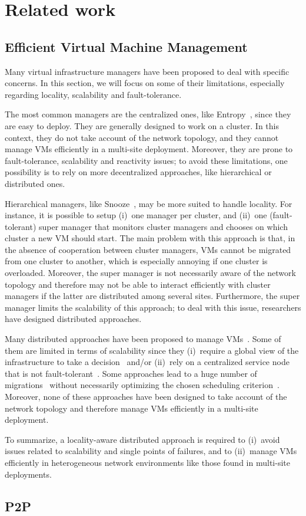 \section{Related work}

\subsection{Efficient Virtual Machine Management}

Many virtual infrastructure managers have been proposed to deal with specific
concerns.
%
In this section, we will focus on some of their limitations, especially
regarding locality, scalability and fault-tolerance.

The most common managers are the centralized ones, like
Entropy~\cite{hermenier:cp11,hermenier:2013}, since they are easy to deploy.
%
They are generally designed to work on a cluster.
%
In this context, they do not take account of the network topology, and they
cannot manage VMs efficiently in a multi-site deployment.
%
Moreover, they are prone to fault-tolerance, scalability and reactivity
issues; to avoid these limitations, one possibility is to rely on more
decentralized approaches, like hierarchical or distributed ones.

Hierarchical managers, like Snooze~\cite{feller:ccgrid12}, may be more suited to
handle locality.
%
For instance, it is possible to setup (i)~one manager per cluster, and (ii)~one
(fault-tolerant) super manager that monitors cluster managers and chooses on
which cluster a new VM should start.
%
%
The main problem with this approach is that, in the absence of cooperation
between cluster managers, VMs cannot be migrated from one cluster to another,
which is especially annoying if one cluster is overloaded.
%
Moreover, the super manager is not necessarily aware of the network topology and
therefore may not be able to interact efficiently with cluster managers if the
latter are distributed among several sites.
%
Furthermore, the super manager limits the scalability of this approach; to deal
with this issue, researchers have designed distributed approaches.

Many distributed approaches have been proposed to manage
VMs~\cite{barbagallo:lncs10,feller:cloudcom12,marzolla:wowmom11,mastroianni:europar11,rouzaudcornabas:vhpc10,yazir:cloud10}.
%
Some of them are limited in terms of scalability since they (i)~require a global
view of the infrastructure to take a
decision~\cite{rouzaudcornabas:vhpc10,yazir:cloud10} and/or (ii)~rely on a
centralized service node that is not
fault-tolerant~\cite{mastroianni:europar11,yazir:cloud10}.
%
Some approaches lead to a huge number of
migrations~\cite{barbagallo:lncs10,mastroianni:europar11} without necessarily
optimizing the chosen scheduling criterion~\cite{barbagallo:lncs10}.
%
Moreover, none of these approaches have been designed to take account of the
network topology and therefore manage VMs efficiently in a multi-site
deployment.

To summarize, a locality-aware distributed approach is required to (i)~avoid
issues related to scalability and single points of failures, and to (ii)~manage
VMs efficiently in heterogeneous network environments like those found in
multi-site deployments.

\subsection{P2P}

